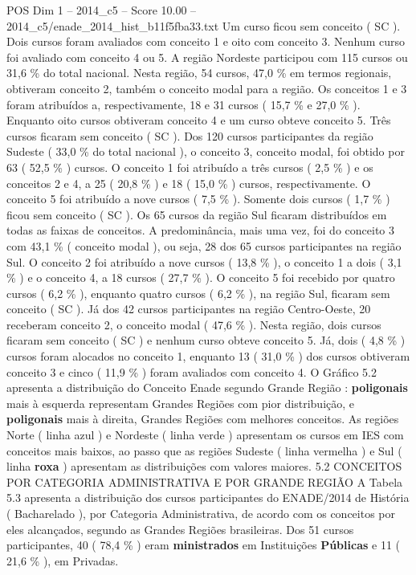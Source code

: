 \begin{textsample}{POS Dim 1 – 2014\_c5 – Score 10.00 – 2014\_c5/enade\_2014\_hist\_b11f5fba33.txt}
Um curso ficou sem conceito ( SC ).
Dois cursos foram avaliados com conceito 1 e oito com conceito 3.
Nenhum curso foi avaliado com conceito 4 ou 5.
A região Nordeste participou com 115 cursos ou 31,6 \% do total nacional.
Nesta região, 54 cursos, 47,0 \% em termos regionais, obtiveram conceito 2, também o conceito modal para a região.
Os conceitos 1 e 3 foram atribuídos a, respectivamente, 18 e 31 cursos ( 15,7 \% e 27,0 \% ).
Enquanto oito cursos obtiveram conceito 4 e um curso obteve conceito 5.
Três cursos ficaram sem conceito ( SC ).
Dos 120 cursos participantes da região Sudeste ( 33,0 \% do total nacional ), o conceito 3, conceito modal, foi obtido por 63 ( 52,5 \% ) cursos.
O conceito 1 foi atribuído a três cursos ( 2,5 \% ) e os conceitos 2 e 4, a 25 ( 20,8 \% ) e 18 ( 15,0 \% ) cursos, respectivamente.
O conceito 5 foi atribuído a nove cursos ( 7,5 \% ).
Somente dois cursos ( 1,7 \% ) ficou sem conceito ( SC ).
Os 65 cursos da região Sul ficaram distribuídos em todas as faixas de conceitos.
A predominância, mais uma vez, foi do conceito 3 com 43,1 \% ( conceito modal ), ou seja, 28 dos 65 cursos participantes na região Sul.
O conceito 2 foi atribuído a nove cursos ( 13,8 \% ), o conceito 1 a dois ( 3,1 \% ) e o conceito 4, a 18 cursos ( 27,7 \% ).
O conceito 5 foi recebido por quatro cursos ( 6,2 \% ), enquanto quatro cursos ( 6,2 \% ), na região Sul, ficaram sem conceito ( SC ).
Já dos 42 cursos participantes na região Centro-Oeste, 20 receberam conceito 2, o conceito modal ( 47,6 \% ).
Nesta região, dois cursos ficaram sem conceito ( SC ) e nenhum curso obteve conceito 5.
Já, dois ( 4,8 \% ) cursos foram alocados no conceito 1, enquanto 13 ( 31,0 \% ) dos cursos obtiveram conceito 3 e cinco ( 11,9 \% ) foram avaliados com conceito 4.
O Gráfico 5.2 apresenta a distribuição do Conceito Enade segundo Grande Região : \textbf{poligonais} mais à esquerda representam Grandes Regiões com pior distribuição, e \textbf{poligonais} mais à direita, Grandes Regiões com melhores conceitos.
As regiões Norte ( linha azul ) e Nordeste ( linha verde ) apresentam os cursos em IES com conceitos mais baixos, ao passo que as regiões Sudeste ( linha vermelha ) e Sul ( linha \textbf{roxa} ) apresentam as distribuições com valores maiores. 5.2 CONCEITOS POR CATEGORIA ADMINISTRATIVA E POR GRANDE REGIÃO A Tabela 5.3 apresenta a distribuição dos cursos participantes do ENADE/2014 de História ( Bacharelado ), por Categoria Administrativa, de acordo com os conceitos por eles alcançados, segundo as Grandes Regiões brasileiras.
Dos 51 cursos participantes, 40 ( 78,4 \% ) eram \textbf{ministrados} em Instituições \textbf{Públicas} e 11 ( 21,6 \% ), em Privadas.

\end{textsample}
